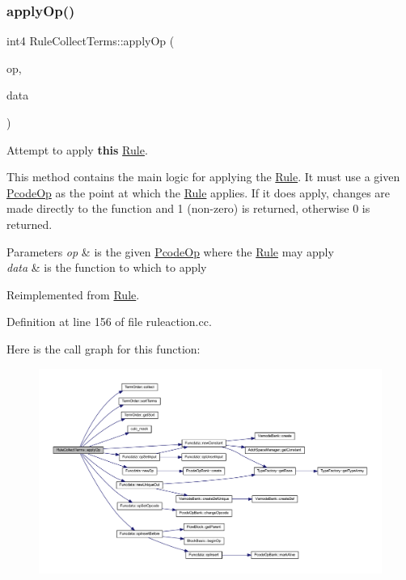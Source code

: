 \subsubsection{\texorpdfstring{applyOp()}{applyOp()}}
{\footnotesize\ttfamily int4 Rule\+Collect\+Terms\+::apply\+Op (\begin{DoxyParamCaption}\item[{\mbox{\hyperlink{class_pcode_op}{Pcode\+Op}} $\ast$}]{op,  }\item[{\mbox{\hyperlink{class_funcdata}{Funcdata}} \&}]{data }\end{DoxyParamCaption})\hspace{0.3cm}{\ttfamily [virtual]}}



Attempt to apply {\bfseries{this}} \mbox{\hyperlink{class_rule}{Rule}}. 

This method contains the main logic for applying the \mbox{\hyperlink{class_rule}{Rule}}. It must use a given \mbox{\hyperlink{class_pcode_op}{Pcode\+Op}} as the point at which the \mbox{\hyperlink{class_rule}{Rule}} applies. If it does apply, changes are made directly to the function and 1 (non-\/zero) is returned, otherwise 0 is returned. 
\begin{DoxyParams}{Parameters}
{\em op} & is the given \mbox{\hyperlink{class_pcode_op}{Pcode\+Op}} where the \mbox{\hyperlink{class_rule}{Rule}} may apply \\
\hline
{\em data} & is the function to which to apply \\
\hline
\end{DoxyParams}


Reimplemented from \mbox{\hyperlink{class_rule_a4e3e61f066670175009f60fb9dc60848}{Rule}}.



Definition at line 156 of file ruleaction.\+cc.

Here is the call graph for this function\+:
\nopagebreak
\begin{figure}[H]
\begin{center}
\leavevmode
\includegraphics[width=350pt]{class_rule_collect_terms_aae26ebf9404cb382f3b373dccbc64c69_cgraph}
\end{center}
\end{figure}
\mbox{\label{class_rule_collect_terms_a6be2ea00cf9d1c164d33b1f662c74c44}} 
